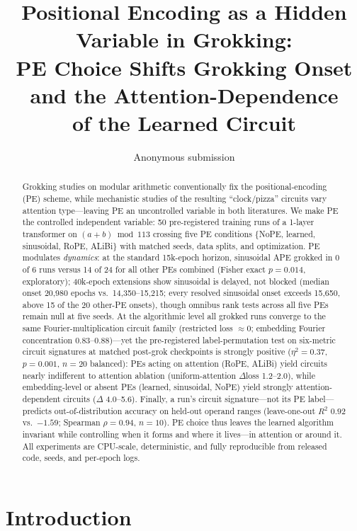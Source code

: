 \documentclass[letterpaper]{article}
\title{Positional Encoding as a Hidden Variable in Grokking:\\
PE Choice Shifts Grokking Onset and the Attention-Dependence\\
of the Learned Circuit}
\author{Anonymous submission}
\begin{document}
\maketitle

\begin{abstract}
Grokking studies on modular arithmetic conventionally fix the positional-encoding
(PE) scheme, while mechanistic studies of the resulting ``clock/pizza'' circuits
vary attention type---leaving PE an uncontrolled variable in both literatures. We
make PE the controlled independent variable: 50 pre-registered training runs of a
1-layer transformer on $(a+b) \bmod 113$ crossing five PE conditions
\{NoPE, learned, sinusoidal, RoPE, ALiBi\} with matched seeds, data splits, and
optimization. PE modulates \emph{dynamics}: at the standard 15k-epoch horizon,
sinusoidal APE grokked in 0 of 6 runs versus 14 of 24 for all other PEs combined
(Fisher exact $p{=}0.014$, exploratory); 40k-epoch extensions show sinusoidal is
delayed, not blocked (median onset 20{,}980 epochs vs.\ 14{,}350--15{,}215;
every resolved sinusoidal onset exceeds 15{,}650, above 15 of the 20 other-PE
onsets), though omnibus rank tests across all five PEs remain null at five seeds.
At the algorithmic level all grokked runs converge to the same
Fourier-multiplication circuit family (restricted loss $\approx 0$; embedding
Fourier concentration $0.83$--$0.88$)---yet the pre-registered label-permutation
test on six-metric circuit signatures at matched post-grok checkpoints is
strongly positive ($\eta^2{=}0.37$, $p{=}0.001$, $n{=}20$ balanced): PEs acting
on attention (RoPE, ALiBi) yield circuits nearly indifferent to attention
ablation (uniform-attention $\Delta$loss 1.2--2.0), while embedding-level or
absent PEs (learned, sinusoidal, NoPE) yield strongly attention-dependent
circuits ($\Delta$ 4.0--5.6). Finally, a run's circuit signature---not its PE
label---predicts out-of-distribution accuracy on held-out operand ranges
(leave-one-out $R^2$ $0.92$ vs.\ $-1.59$; Spearman $\rho{=}0.94$, $n{=}10$).
PE choice thus leaves the learned algorithm invariant while controlling when it
forms and where it lives---in attention or around it. All experiments are
CPU-scale, deterministic, and fully reproducible from released code, seeds, and
per-epoch logs.
\end{abstract}

\section{Introduction}
\end{document}
